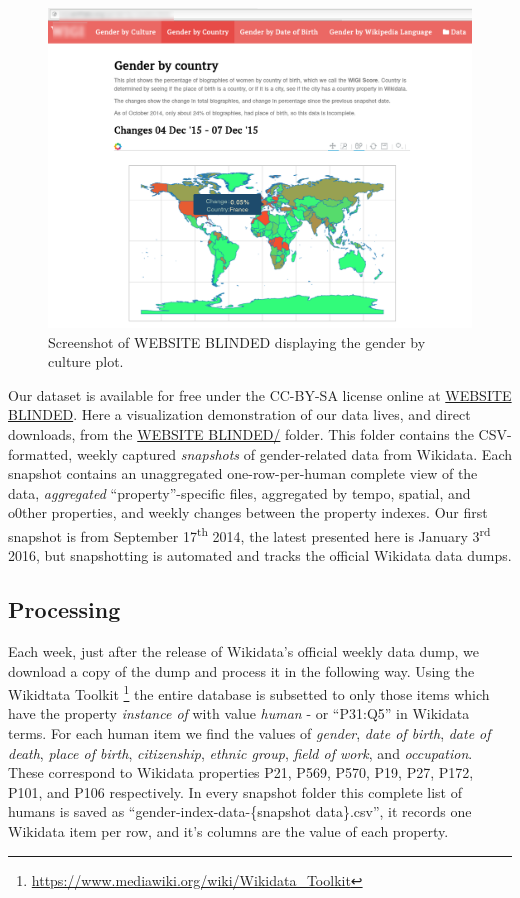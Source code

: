 \documentclass[letterpaper]{article}
\begin{document}
\begin{figure}
\label{fig:screenshot}
\includegraphics[scale=0.2]{figures/website_screenshot.png} 
\caption{Screenshot of WEBSITE BLINDED displaying the gender by culture plot.}
\end{figure}

Our dataset is available for free under the CC-BY-SA license online at  \url{WEBSITE BLINDED}. Here a visualization demonstration of our data lives, and direct downloads, from the \url{WEBSITE BLINDED/} folder. 	This folder contains the CSV-formatted, weekly captured \textit{snapshots} of gender-related data from Wikidata. Each snapshot contains an unaggregated one-row-per-human complete view of the data, \textit{aggregated} ``property''-specific files, aggregated by tempo, spatial, and o0ther properties, and weekly changes between the property indexes. Our first snapshot is from September 17\textsuperscript{th} 2014, the latest presented here is January 3\textsuperscript{rd} 2016, but snapshotting is automated and tracks the official Wikidata data dumps.

\subsection{Processing}
Each week, just after the release of Wikidata's official weekly data dump, we download a copy of the dump and process it in the following way. Using the Wikidtata Toolkit \footnote{\url{https://www.mediawiki.org/wiki/Wikidata_Toolkit}} the entire database is subsetted to only those items which have the property \textit{instance of} with value \textit{human} - or ``P31:Q5'' in Wikidata terms. For each human item we find the values of \textit{gender}, \textit{date of birth}, \textit{date of death}, \textit{place of birth}, \textit{citizenship}, \textit{ethnic group}, \textit{field of work}, and \textit{occupation}. These correspond to Wikidata properties P21, P569, P570, P19, P27, P172, P101, and P106 respectively.  In every snapshot folder this complete list of humans is saved as ``gender-index-data-\{snapshot data\}.csv'', it records one Wikidata item per row, and it's columns are the value of each property. 
\end{document}
